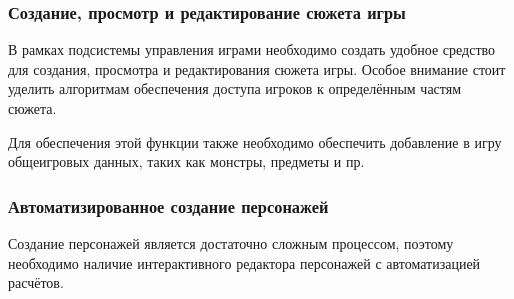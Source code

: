 \subsubsection{Создание, просмотр и редактирование сюжета игры}

В рамках подсистемы управления играми необходимо создать удобное средство для создания, просмотра и редактирования сюжета игры. Особое внимание стоит уделить алгоритмам обеспечения доступа игроков к определённым частям сюжета.

Для обеспечения этой функции также необходимо обеспечить добавление в игру общеигровых данных, таких как монстры, предметы и пр.


\subsubsection{Автоматизированное создание персонажей}

Создание персонажей является достаточно сложным процессом, поэтому необходимо наличие интерактивного редактора персонажей с автоматизацией расчётов.
